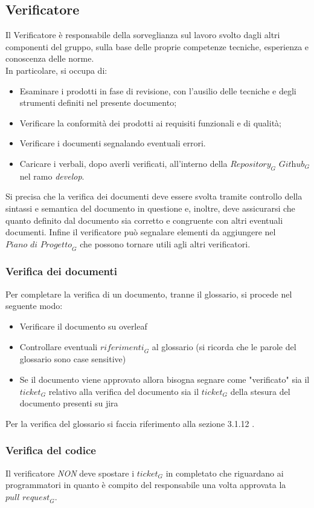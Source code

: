 \subsection{Verificatore}
Il Verificatore è responsabile della sorveglianza sul lavoro svolto dagli altri componenti del gruppo, sulla base delle proprie competenze tecniche, esperienza e conoscenza delle norme. \\
In particolare, si occupa di:
\begin{itemize}
    \item Esaminare i prodotti in fase di revisione, con l'ausilio delle tecniche e degli strumenti definiti nel presente documento;
    \item Verificare la conformità dei prodotti ai requisiti funzionali e di qualità;
    \item Verificare i documenti segnalando eventuali errori.
    \item Caricare i verbali, dopo averli verificati, all'interno della $\textit{Repository}_G$ $\textit{Github}_G$ nel ramo \textit{develop}.
\end{itemize}
Si precisa che la verifica dei documenti deve essere svolta tramite controllo della sintassi e semantica del documento in questione e, inoltre, deve assicurarsi che quanto definito dal documento sia corretto e congruente con altri eventuali documenti.
Infine il verificatore può segnalare elementi da aggiungere nel $\textit{Piano di Progetto}_G$ che possono tornare utili agli altri verificatori. \\
\subsubsection{Verifica dei documenti}
Per completare la verifica di un documento, tranne il glossario, si procede nel seguente modo:
\begin{itemize}
    \item Verificare il documento su overleaf
    \item Controllare eventuali $\textit{riferimenti}_G$ al glossario (si ricorda che le parole del glossario sono case sensitive)
    \item Se il documento viene approvato allora bisogna segnare come "verificato" sia il $\textit{ticket}_G$ relativo alla verifica del documento sia il $\textit{ticket}_G$ della stesura del documento presenti su jira
\end{itemize}
Per la verifica del glossario si faccia riferimento alla sezione 3.1.12 .
\subsubsection{Verifica del codice}
Il verificatore \emph{NON} deve spostare i $\textit{ticket}_G$ in completato che riguardano ai programmatori in quanto è compito del responsabile una volta approvata la $\textit{pull request}_G$.
